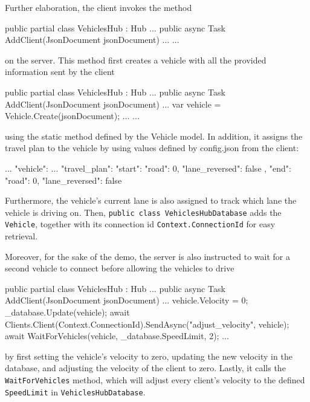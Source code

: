Further elaboration, the client invokes the method
\begin{csharp}
public partial class VehiclesHub : Hub
{
	...
	public async Task AddClient(JsonDocument jsonDocument) {...}
	...
}
\end{csharp}
on the server. This method first creates a vehicle with all the provided information sent by the client
\begin{csharp}
public partial class VehiclesHub : Hub
{
	...
	public async Task AddClient(JsonDocument jsonDocument)
	{
		...
		var vehicle = Vehicle.Create(jsonDocument);
		...
	}
	...
}
\end{csharp}
using the static method defined by the Vehicle model. In addition, it assigns the travel plan to the vehicle by using values defined by config.json from the client:
\begin{json}
{
	...
	"vehicle": {
		...
		"travel_plan": {
			"start": {
				"road": 0,
				"lane_reversed": false
			},
			"end": {
				"road": 0,
				"lane_reversed": false
			}
		}
	}
}
\end{json}

Furthermore, the vehicle's current lane is also assigned to track which lane the vehicle is driving on. Then, \verb|public class VehiclesHubDatabase| adds the \verb|Vehicle|, together with its connection id \verb|Context.ConnectionId| for easy retrieval.

Moreover, for the sake of the demo, the server is also instructed to wait for a second vehicle to connect before allowing the vehicles to drive
\begin{csharp}
public partial class VehiclesHub : Hub
{
	...
	public async Task AddClient(JsonDocument jsonDocument)
	{
		...
		vehicle.Velocity = 0;
		_database.Update(vehicle);
		await Clients.Client(Context.ConnectionId).SendAsync("adjust_velocity", vehicle);
		await WaitForVehicles(vehicle, _database.SpeedLimit, 2);
	}
	...
}
\end{csharp}
by first setting the vehicle's velocity to zero, updating the new velocity in the database, and adjusting the velocity of the client to zero. Lastly, it calls the \verb|WaitForVehicles| method, which will adjust every client's velocity to the defined \verb|SpeedLimit| in \verb|VehiclesHubDatabase|.
